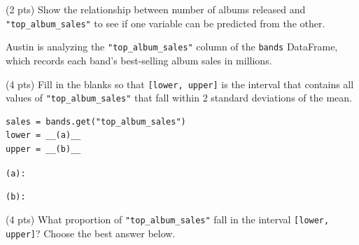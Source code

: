 \documentclass[twoside,12pt]{article}
\begin{document}
\begin{probset}
\begin{prob}[(10 pts)]
\begin{subprobset}
\begin{subprob}
\smallskip
{}  

\end{subprob}
\begin{subprob}(2 pts)
Show the relationship between number of albums released and \texttt{"top\_album\_sales"} to see if one variable can be predicted from the other.

\smallskip
{}  
\end{subprob}

\end{subprobset}

\end{prob}

\newpage

\begin{prob}[(8 pts)]

Austin is analyzing the \texttt{"top\_album\_sales"} column of the \texttt{bands} DataFrame, which records each band's best-selling album sales in millions. 

\begin{subprobset}

\begin{subprob}(4 pts)
Fill in the blanks so that \texttt{[lower, upper]} is the interval that contains all values of \texttt{"top\_album\_sales"} that fall within 2 standard deviations of the mean.

\begin{verbatim}
sales = bands.get("top_album_sales")
lower = __(a)__
upper = __(b)__
\end{verbatim}

\texttt{(a):} 

\smallskip
\texttt{(b):} 

\begin{soln}

\end{soln}

\end{subprob}

\bigskip

\begin{subprob}(4 pts)
What proportion of \texttt{"top\_album\_sales"} fall in the interval \texttt{[lower, upper]}? Choose the best answer below.

\medskip



\end{subprob}
\end{subprobset}
\end{prob}
\end{probset}
\end{document}
